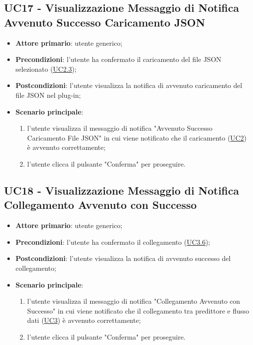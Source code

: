 	
	\label{par:UC17}
	\subsection{UC17 - Visualizzazione Messaggio di Notifica Avvenuto Successo Caricamento JSON}
		\begin{itemize}
			\item\textbf{Attore primario}: utente generico;
			\item\textbf{Precondizioni}: l’utente ha confermato il caricamento del file JSON selezionato (\hyperref[par:UC2.3]{UC2.3});
			\item\textbf{Postcondizioni}: l’utente visualizza la notifica di avvenuto caricamento del file JSON nel plug-in;
			\item\textbf{Scenario principale}:
				\begin{enumerate}
					\item l’utente visualizza il messaggio di notifica "Avvenuto Successo Caricamento File JSON" in cui viene notificato che il caricamento (\hyperref[par:UC2]{UC2}) è avvenuto correttamente;
					\item l'utente clicca il pulsante "Conferma" per proseguire.		
				\end{enumerate}		
		\end{itemize}

	
	\label{par:UC18}
	\subsection{UC18 - Visualizzazione Messaggio di Notifica Collegamento Avvenuto con Successo}
		\begin{itemize}
			\item\textbf{Attore primario}: utente generico;
			\item\textbf{Precondizioni}: l’utente ha confermato il collegamento (\hyperref[par:UC3.6]{UC3.6});
			\item\textbf{Postcondizioni}: l’utente visualizza la notifica di avvenuto successo del collegamento;
			\item\textbf{Scenario principale}:
				\begin{enumerate}
					\item l’utente visualizza il messaggio di notifica "Collegamento Avvenuto con Successo" in cui viene notificato che il collegamento tra predittore e flusso dati (\hyperref[par:UC3]{UC3}) è avvenuto correttamente;
					\item l'utente clicca il pulsante "Conferma" per proseguire.		
				\end{enumerate}		
		\end{itemize}
	
